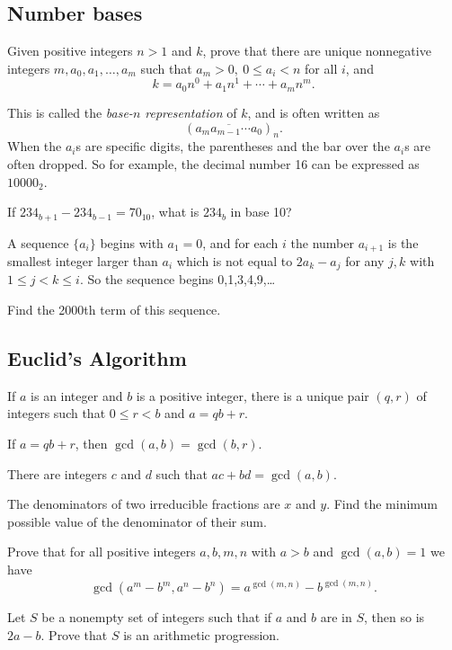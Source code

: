 \subsection{Number bases}\label{b:n:bases}
\begin{result}{\label{r:b:n:b:1}}
    Given positive integers $n>1$ and $k$, prove that there are unique
      nonnegative integers $m,a_0,a_1,\ldots,a_m$ such that $a_m>0,\ 0\le
      a_i<n$ for all $i$, and
      \[k=a_0 n^0+a_1 n^1+\cdots+a_m n^m.\]
\end{result}
This is called the \emph{base-$n$ representation} of $k$, and is often written
as
\[(\overline{a_m a_{m-1}\cdots a_0})_n.\]
When the $a_i$s are specific digits, the parentheses and the bar over the $a_i$s
are often dropped. So for example, the decimal number 16 can be expressed as
$10000_2$.
\begin{problem}{\label{p:b:n:b:1}}
   If $234_{b+1}-234_{b-1}=70_{10}$, what is $234_b$ in base 10?
\end{problem}
\begin{problem}{\label{p:b:n:b:2}}
  A sequence $\{a_i\}$ begins with $a_1=0$, and for each $i$ the number
    $a_{i+1}$ is the smallest integer larger than $a_i$ which is not
    equal to $2a_k-a_j$ for any $j,k$ with $1\le j<k\le i$. So the sequence begins
    0,1,3,4,9,\ldots

    Find the 2000th term of this sequence.
\end{problem}
\subsection{Euclid's Algorithm}\label{b:n:euclid}
\begin{result}{\label{r:b:n:e:1}}
    If $a$ is an integer and $b$ is a positive integer, there
      is a unique pair $(q,r)$ of integers such that $0\le r<b$ and $a=qb+r$.
\end{result}
\begin{result}{\label{r:b:n:e:2}}
    If $a=qb+r$, then $\gcd(a,b)=\gcd(b,r)$.
\end{result}
\begin{result}{\label{r:b:n:e:3}}
    There are integers $c$ and $d$ such that $ac+bd=\gcd(a,b)$.
\end{result}
\begin{problem}{\label{p:b:n:e:1}}
    The denominators of two irreducible fractions are $x$ and $y$. Find the
    minimum possible value of the denominator of their sum.
\end{problem}
\begin{result}{\label{r:b:n:e:4}}
    Prove that for all positive integers $a,b,m,n$ with $a>b$ and $\gcd(a,b)=1$ we have
    \[\gcd(a^m-b^m,a^n-b^n)=a^{\gcd(m,n)}-b^{\gcd(m,n)}.\]
\end{result}
\begin{problem}{\label{p:b:n:e:2}}
    Let $S$ be a nonempty set of integers such that if $a$ and $b$ are in $S$, then
      so is $2a-b$. Prove that $S$ is an arithmetic progression.
\end{problem}
